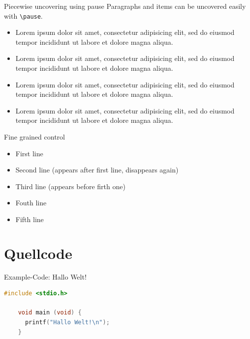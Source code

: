 \begin{frame}{Piecewise uncovering using pause}
  Paragraphs and items can be uncovered easily with \texttt{\textbackslash pause}.
  \pause
  \begin{itemize}
    \item Lorem ipsum dolor sit amet, consectetur adipisicing elit, sed do eiusmod tempor incididunt ut labore et dolore magna aliqua.
      \pause
    \item Lorem ipsum dolor sit amet, consectetur adipisicing elit, sed do eiusmod tempor incididunt ut labore et dolore magna aliqua.
      \pause
    \item Lorem ipsum dolor sit amet, consectetur adipisicing elit, sed do eiusmod tempor incididunt ut labore et dolore magna aliqua.
      \pause
    \item Lorem ipsum dolor sit amet, consectetur adipisicing elit, sed do eiusmod tempor incididunt ut labore et dolore magna aliqua.
  \end{itemize}
\end{frame}

\begin{frame}{Fine grained control}
  \begin{itemize}
    \item<1-> First line
    \item<2>  Second line (appears after first line, disappears again)
    \item<3-4> Third line (appears before firth one)
    \item<4-> Fouth line
    \item<5-> Fifth line
  \end{itemize}

\end{frame}

\section{Quellcode}

\begin{frame}[fragile]{Example-Code: Hallo Welt!}
  \begin{lstlisting}[language=C,gobble=4]
    #include <stdio.h>

    void main (void) {
      printf("Hallo Welt!\n");
    }
  \end{lstlisting}
\end{frame}





